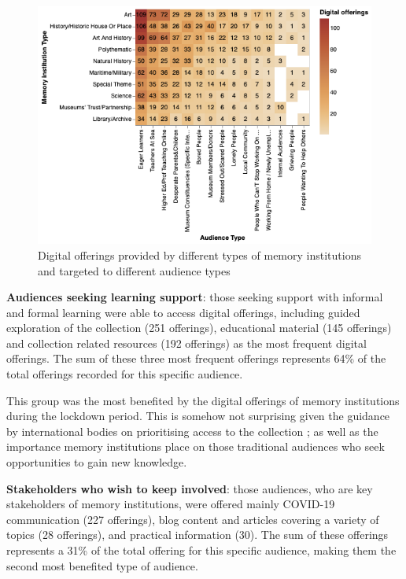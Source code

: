 \documentclass{egpubl}
\begin{document}
\begin{figure}[h]
  \centering
  \includegraphics[width=\linewidth]{images/audiencesboth.png}
  \caption{\label{fig:MTypeAudiences}
           Digital offerings provided by different types of memory institutions and targeted to different audience types}
\end{figure}

\noindent \textbf{Audiences seeking learning support}: those seeking support with informal and formal learning were able to access digital offerings, including guided exploration of the collection (251 offerings), educational material (145 offerings) and collection related resources (192 offerings) as the most frequent digital offerings. The sum of these three most frequent offerings represents 64\% of the total offerings recorded for this specific audience. 

This group was the most benefited by the digital offerings of memory institutions during the lockdown period. This is somehow not surprising given the guidance by international bodies on prioritising access to the collection \cite{InternationalCouncilofMuseums2020}; as well as the importance memory institutions place on those traditional audiences who seek opportunities to gain new knowledge. 

\noindent \textbf{Stakeholders who wish to keep involved}: those audiences, who are key stakeholders of memory institutions, were offered mainly COVID-19 communication (227 offerings), blog content and articles covering a variety of topics (28 offerings), and practical information (30). The sum of these offerings represents a 31\% of the total offering for this specific audience, making them the second most benefited type of audience. 
\end{document}
